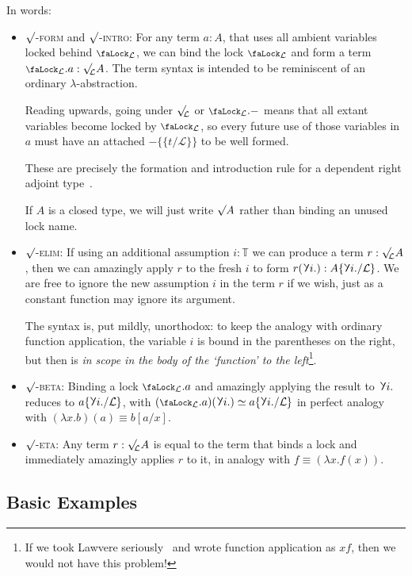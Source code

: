 \documentclass[10pt]{article}
\theoremstyle{definition}
\let\oldequiv\equiv%
\renewcommand{\equiv}{\simeq}
\newcommand{\defeq}{\oldequiv}
\newcommand{\rulen}[1]{\textsc{#1}}
\newcommand{\lock}{\mathchoice {\scalebox{0.8}{\text{\faLock}}}
  {\scalebox{0.8}{\text{\faLock}}} {\scalebox{0.5}{\text{\faLock}}}
  {\scalebox{0.4}{\text{\faLock}}} }
\newcommand{\rbindsym}{%
  \mathchoice
    {\reflectbox{\rotatebox[origin=c]{185}{$\lambda$}}}  %
    {\reflectbox{\rotatebox[origin=c]{185}{$\lambda$}}}  %
    {\reflectbox{\rotatebox[origin=c]{185}{$\scriptstyle\lambda$}}}  %
    {\reflectbox{\rotatebox[origin=c]{185}{$\scriptscriptstyle\lambda$}}}  %
  }
\newcommand{\rbind}[1]{\rbindsym{} #1.}
\newcommand{\Tiny}{\mathbb{T}}
\newcommand{\lockn}[1]{\mathcal{#1}}
\newcommand{\ctxlocke}[1]{\lock_{#1}}
\newcommand{\ctxlock}[1]{\ctxlocke{\lockn{#1}}}
\newcommand{\stubra}[1]{\{\!\!\{ #1 \}\!\!\}}
\newcommand{\admbra}[1]{\{\mkern-1mu #1 \mkern-0.5mu\}}
\newcommand{\substuck}[2]{\stubra{#1/\lockn{#2}}}
\newcommand{\sublock}[2]{\admbra{\rbindsym{} #1. /\lockn{#2} }}
\newcommand{\rformsym}{\surd}
\newcommand{\rforme}[2]{\ThisStyle{\raisebox{0.07em}{$\SavedStyle \rformsym_{\hspace{-0.25em}#1}$}} #2}
\newcommand{\rform}[2]{\rforme{\lockn{#1}}{#2}}
\newcommand{\rformu}[1]{\ThisStyle{\raisebox{0.07em}{$\SavedStyle \rformsym$}} #1}
\newcommand{\rintroe}[2]{\lock_{#1}. #2}
\newcommand{\rintro}[2]{\rintroe{\lockn{#1}}{#2}}
\begin{document}
In words:
\begin{itemize}
\item \rulen{$\rformsym$-form} and \rulen{$\rformsym$-intro}: For any
  term $a : A$, that uses all ambient variables locked behind
  $\ctxlock{L}$, we can bind the lock $\ctxlock{L}$ and form a term
  $\rintro{L} a : \rform{L} A$. The term syntax is intended to be
  reminiscent of an ordinary $\lambda$-abstraction.

  Reading upwards, going under $\rform{L}$ or $\rintro{L} -$ means
  that all extant variables become locked by $\ctxlock{L}$, so every
  future use of those variables in $a$ must have an attached
  $-\substuck{t}{L}$ to be well formed.

  These are precisely the formation and introduction rule for a
  dependent right adjoint type~\cite{drats}.

  If $A$ is a closed type, we will just write $\rformu A$ rather than
  binding an unused lock name.
  
\item \rulen{$\rformsym$-elim}: If using an additional assumption
  $i : \Tiny$ we can produce a term $r : \rform{L} A$, then we can
  amazingly apply $r$ to the fresh $i$ to form
  $r(\rbind{i}) : A\sublock{i}{L}$. We are free to ignore the new
  assumption $i$ in the term $r$ if we wish, just as a constant
  function may ignore its argument.

  The syntax is, put mildly, unorthodox: to keep the analogy with
  ordinary function application, the variable $i$ is bound in the
  parentheses on the right, but then is \emph{in scope in the body of
    the `function' to the left}\footnote{If we took Lawvere
    seriously~\cite{lawvere:adjointness-foundations} and wrote
    function application as $xf$, then we would not have this
    problem!}.

\item \rulen{$\rformsym$-beta}: Binding a lock $\rintro{L} a$ and
  amazingly applying the result to $\rbind{i}$ reduces to
  $a\sublock{i}{L}$, with
  $(\rintro{L}{a})(\rbind{i}) \defeq a\sublock{i}{L}$ in perfect
  analogy with $(\lambda x. b)(a) \defeq b[a/x]$.
  
\item \rulen{$\rformsym$-eta}: Any term $r : \rform{L} A$ is equal to
  the term that binds a lock and immediately amazingly applies $r$ to
  it, in analogy with $f \defeq (\lambda x. f(x))$.
\end{itemize}

\subsection{Basic Examples}
\end{document}
